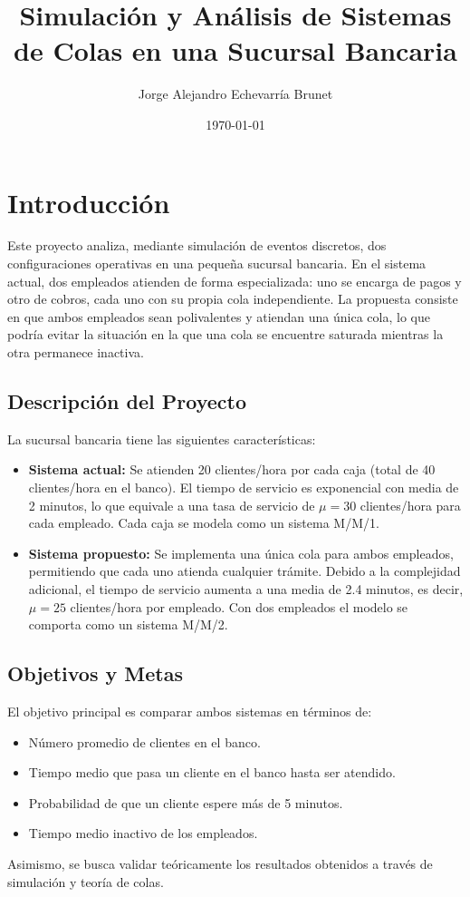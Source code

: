 \documentclass[12pt]{article}
\title{Simulación y Análisis de Sistemas de Colas en una Sucursal Bancaria}
\author{Jorge Alejandro Echevarría Brunet}
\date{\today}
\begin{document}
\maketitle

\newpage

\tableofcontents

\newpage

\section{Introducción}\label{sec:introduccion}
Este proyecto analiza, mediante simulación de eventos discretos, dos configuraciones operativas en una pequeña sucursal bancaria. En el sistema actual, dos empleados atienden de forma especializada: uno se encarga de pagos y otro de cobros, cada uno con su propia cola independiente. La propuesta consiste en que ambos empleados sean polivalentes y atiendan una única cola, lo que podría evitar la situación en la que una cola se encuentre saturada mientras la otra permanece inactiva.

\subsection{Descripción del Proyecto}
La sucursal bancaria tiene las siguientes características:
\begin{itemize}
    \item \textbf{Sistema actual:} Se atienden 20 clientes/hora por cada caja (total de 40 clientes/hora en el banco). El tiempo de servicio es exponencial con media de 2 minutos, lo que equivale a una tasa de servicio de \(\mu = 30\) clientes/hora para cada empleado. Cada caja se modela como un sistema M/M/1.
    \item \textbf{Sistema propuesto:} Se implementa una única cola para ambos empleados, permitiendo que cada uno atienda cualquier trámite. Debido a la complejidad adicional, el tiempo de servicio aumenta a una media de 2.4 minutos, es decir, \(\mu = 25\) clientes/hora por empleado. Con dos empleados el modelo se comporta como un sistema M/M/2.
\end{itemize}

\subsection{Objetivos y Metas}
El objetivo principal es comparar ambos sistemas en términos de:
\begin{itemize}
    \item Número promedio de clientes en el banco.
    \item Tiempo medio que pasa un cliente en el banco hasta ser atendido.
    \item Probabilidad de que un cliente espere más de 5 minutos.
    \item Tiempo medio inactivo de los empleados.
\end{itemize}
Asimismo, se busca validar teóricamente los resultados obtenidos a través de simulación y teoría de colas.
\end{document}
